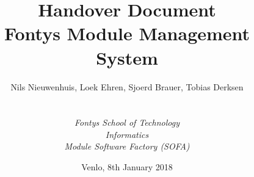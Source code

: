 

\def\Company{Fontys Sofa Group 1}
\def\Institute{\textit{Fontys School of Technology}}
\def\Course{\textit{Informatics}}
\def\Module{\textit{Module Software Factory (SOFA)}}

\def\BoldTitle{Handover Document}
\def\Subtitle{Fontys Module Management System}
\def\Authors{Nils Nieuwenhuis, Loek Ehren, Sjoerd Brauer, Tobias Derksen}


\title{\textbf{\BoldTitle}\\\Subtitle}
\author{\Authors \\ \\ \\ \Institute\\ \Course\\ \Module}
\date{Venlo, 8th January 2018}
